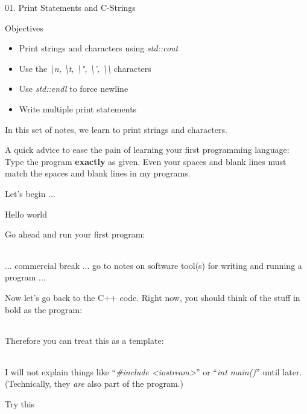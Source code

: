 \documentclass[
]{article}
\author{}
\date{}
\providecommand{\tightlist}{%
  \setlength{\itemsep}{0pt}\setlength{\parskip}{0pt}}
\begin{document}
01. Print Statements and C-Strings

Objectives

\begin{itemize}
\tightlist
\item
  Print strings and characters using \emph{std::cout}
\item
  Use the \emph{\textbackslash n,} \emph{\textbackslash t,
  \textbackslash", \textbackslash', \textbackslash\textbackslash{}}
  characters
\item
  Use \emph{std::endl} to force newline
\item
  Write multiple print statements
\end{itemize}

In this set of notes, we learn to print strings and characters.

A quick advice to ease the pain of learning your first programming
language: Type the program \textbf{exactly} as given. Even your spaces
and blank lines must match the spaces and blank lines in my programs.

Let's begin ...

Hello world

Go ahead and run your first program:

\begin{longtable}[]{@{}@{}}
\toprule
\endhead
\bottomrule
\end{longtable}

... commercial break ... go to notes on software tool(s) for writing and
running a program ...

Now let's go back to the C++ code. Right now, you should think of the
stuff in bold as the program:

\begin{longtable}[]{@{}@{}}
\toprule
\endhead
\bottomrule
\end{longtable}

Therefore you can treat this as a template:

\begin{longtable}[]{@{}@{}}
\toprule
\endhead
\bottomrule
\end{longtable}

I will not explain things like ``\emph{\#include
\textless iostream\textgreater{}}'' or ``\emph{int main()}'' until
later. (Technically, they \emph{are} also part of the program.)

Try this

\begin{longtable}[]{@{}@{}}
\toprule
\endhead
\bottomrule
\end{longtable}
\end{document}
